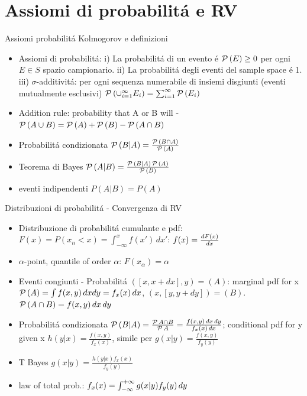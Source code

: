 \documentclass[asd-beamer.tex]{subfiles}
\begin{document}
\section{Assiomi di probabilit\'a e RV}

\begin{frame}{Assiomi probabilit\'a Kolmogorov e definizioni}
\begin{itemize}
	\item Assiomi di probabilit\'a: i) La probabilit\'a di un evento \'e $\prob{(E)}\geq0$ per ogni $E\in S$ spazio campionario.
	ii) La probabilit\'a degli eventi del sample space \'e 1.
	iii) $\sigma$-additivit\'a: per ogni sequenza numerabile di insiemi disgiunti (eventi mutualmente esclusivi) $\prob{(\cup_{i=1}^{\infty}E_i)}=\sum_{i=1}^{\infty}\prob{(E_i)}$
	\item Addition rule: probability that A or B will - $\prob{(A\cup B)}=\prob{(A)}+\prob{(B)}-\prob{(A\cap B)}$
	\item Probabilit\'a condizionata $\prob{(B|A)}=\frac{\prob{(B\cap A)}}{\prob{(A)}}$
	\item Teorema di Bayes $\prob{(A|B)}=\frac{\prob{(B|A)}\prob{(A)}}{\prob{(B)}}$
	\item eventi indipendenti $P(A|B)=P(A)$
\end{itemize}
\end{frame}

\begin{frame}{Distribuzioni di probabilit\'a - Convergenza di RV}
\begin{itemize}
\item Distribuzione di probabilit\'a cumulante e pdf: 	$F(x)=P(x_n<x)=\int_{-\infty}^xf(x')\,dx'$: $f(x)=\TDy{x}{F(x)}$
\item $\alpha$-point, quantile of order $\alpha$: $F(x_{\alpha})=\alpha$
\item Eventi congiunti - Probabilit\'a $([x,x+dx],y)=(A)$: marginal pdf for x $\prob{(A)}=\int f(x,y)\,dxdy=f_x(x)\,dx$, $(x,[y,y+dy])=(B)$.
$\prob{(A\cap B)}=f(x,y)\,dx\,dy$
\item Probabilit\'a condizionata $\prob{(B|A)}=\frac{\prob{A\cap B}}{\prob{A}}=\frac{f(x,y)\,dx\,dy}{f_x(x)\,dx}$; conditional pdf for y given x $h(y|x)=\frac{f(x,y)}{f_x(x)}$, simile per $g(x|y)=\frac{f(x,y)}{f_y(y)}$
\item T Bayes $g(x|y)=\frac{h(y|x)f_x(x)}{f_y(y)}$
\item law of total prob.: $f_x(x)=\intsinf{}g(x|y)f_y(y)\,dy$
\end{itemize}
\end{frame}
\end{document}
